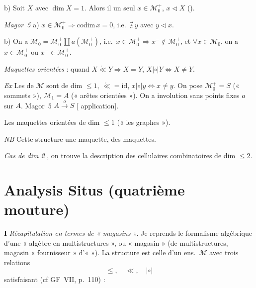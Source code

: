 \documentclass[11pt,a4paper]{article}
\begin{document}
b) Soit $X$ avec $\dim X = 1$. Alors il   un seul $x \in \mathcal{M}_0^{+}$, $x \lhd X$ ().

\emph{Magor~5} a) $x \in \mathcal{M}_0^{+} \Rightarrow \mathrm{codim}\, x = 0$, i.e.\ $\nexists\, y$ avec $y \lhd x$.

b) On a $\mathcal{M}_0 = \mathcal{M}_0^{+} \amalg a(\mathcal{M}_0^{+})$, i.e.\ $x \in \mathcal{M}_0^{+} \Rightarrow x^{-} \notin \mathcal{M}_0^{+}$, et $\forall x \in \mathcal{M}_0$, on a $x \in \mathcal{M}_0^{+}$ ou $x^{-} \in \mathcal{M}_0^{+}$.

\emph{Maquettes orientées} : quand $X \mathring{\ll} Y \Rightarrow X = Y$, $X |\circ| Y \Leftrightarrow X \neq Y$.

\emph{Ex} Les  de $\mathcal{M}$ sont de dim $\leq 1$, $\mathring{\ll} = \mathrm{id}$, $x |\circ| y \Leftrightarrow x \neq y$.
On pose $\mathcal{M}_0^{+} = S$ (« sommets »), $\mathcal{M}_1 = A$ (« arêtes orientées »).
On a involution sans points fixes $a$ sur $A$.
\struck{\ill{}} Magor~5 \ill{} $A \xrightarrow{\;o\;} S$ [\ill{} application].

Les maquettes orientées \struck{\ill{}} de dim $\leq 1$ \uncertain{$\lhd$} (« les graphes »).

\emph{NB} Cette structure \ill{}  une maquette, \ill{}  \struck{\ill{}} \ill{} des maquettes.

\emph{Cas de \struck{\ill{}} dim 2} \ill{}, on trouve la description des \ill{} cellulaires combinatoires de dim $\leq 2$.


\section{Analysis Situs (quatrième mouture)}

\textbf{I} \emph{Récapitulation en termes de « magasins ».}
Je reprends le formalisme algébrique d'une « algèbre en multistructures », ou « magasin » (de multistructures, magasin « fournisseur » d'« \ill{} »). La structure est celle d'un ens.\ $\mathcal{M}$ avec trois relations
\[
  \leq,\quad \ll,\quad |\circ|
\]
satisfaisant (cf GF~VII, p.~110) :
\end{document}
